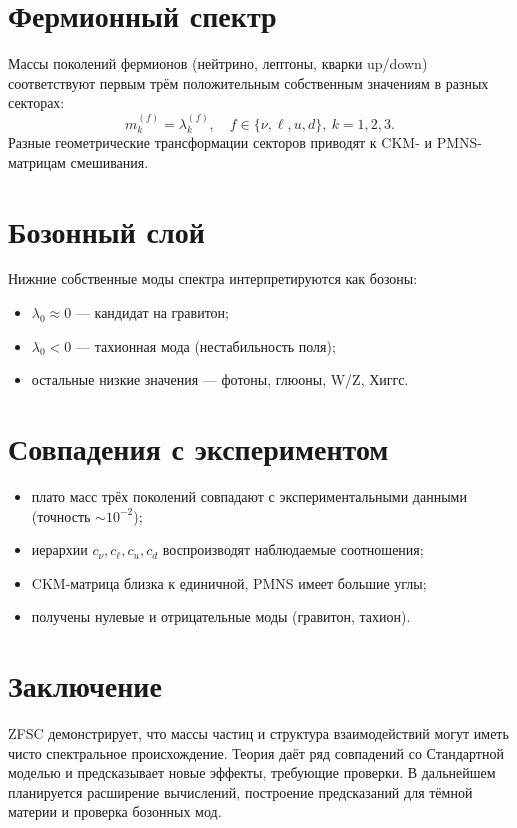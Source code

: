 \documentclass[12pt,a4paper]{article}
\begin{document}
\section{Фермионный спектр}
Массы поколений фермионов (нейтрино, лептоны, кварки up/down) соответствуют первым трём положительным собственным значениям в разных секторах:
\[
m^{(f)}_k = \lambda^{(f)}_k, \quad f \in \{ \nu, \ell, u, d \}, \ k=1,2,3.
\]
Разные геометрические трансформации секторов приводят к CKM- и PMNS-матрицам смешивания.

\section{Бозонный слой}
Нижние собственные моды спектра интерпретируются как бозоны:
\begin{itemize}
  \item $\lambda_0 \approx 0$ --- кандидат на гравитон;
  \item $\lambda_0 < 0$ --- тахионная мода (нестабильность поля);
  \item остальные низкие значения --- фотоны, глюоны, W/Z, Хиггс.
\end{itemize}

\section{Совпадения с экспериментом}
\begin{itemize}
  \item плато масс трёх поколений совпадают с экспериментальными данными (точность $\sim 10^{-2}$);
  \item иерархии $c_\nu, c_\ell, c_u, c_d$ воспроизводят наблюдаемые соотношения;
  \item CKM-матрица близка к единичной, PMNS имеет большие углы;
  \item получены нулевые и отрицательные моды (гравитон, тахион).
\end{itemize}

\section{Заключение}
ZFSC демонстрирует, что массы частиц и структура взаимодействий могут иметь чисто спектральное происхождение. 
Теория даёт ряд совпадений со Стандартной моделью и предсказывает новые эффекты, требующие проверки.
В дальнейшем планируется расширение вычислений, построение предсказаний для тёмной материи и проверка бозонных мод.
\end{document}
